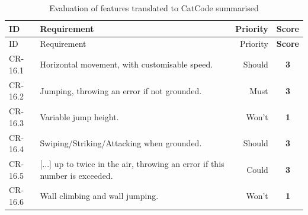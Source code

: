 \begin{center}
  \begin{longtable}{lp{9.5cm}rc}
    \caption{Evaluation of features translated to CatCode summarised} \label{tab:results/cr/autoCatFeaturesInCatCode} \\
    \toprule
    ID
    & Requirement
    & Priority
    & \textbf{Score}\\ \midrule
    \endfirsthead
    \toprule
    ID
    & Requirement
    & Priority
    & \textbf{Score}\\ \midrule
    \endhead
    CR-16.1
    & Horizontal movement, with customisable speed.
    & Should
    & \textbf{3}
    \\
    CR-16.2
    & Jumping, throwing an error if not grounded.
    & Must
    & \textbf{3}
    \\
    CR-16.3
    & Variable jump height.
    & Won't
    & \textbf{1}
    \\
    CR-16.4
    & Swiping/Striking/Attacking when grounded.
    & Should
    & \textbf{3}
    \\
    CR-16.5
    & [...] up to twice in the air, throwing an error if this number is exceeded.
    & Could
    & \textbf{3}
    \\
    CR-16.6
    & Wall climbing and wall jumping.
    & Won't
    & \textbf{1}
    \\ 
    \bottomrule
  \end{longtable}
\end{center}